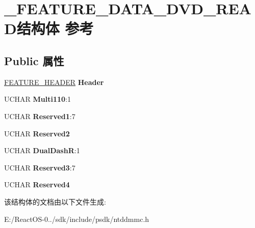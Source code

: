 \hypertarget{struct___f_e_a_t_u_r_e___d_a_t_a___d_v_d___r_e_a_d}{}\section{\+\_\+\+F\+E\+A\+T\+U\+R\+E\+\_\+\+D\+A\+T\+A\+\_\+\+D\+V\+D\+\_\+\+R\+E\+A\+D结构体 参考}
\label{struct___f_e_a_t_u_r_e___d_a_t_a___d_v_d___r_e_a_d}
\subsection*{Public 属性}
\begin{DoxyCompactItemize}
\item 
\mbox{\label{struct___f_e_a_t_u_r_e___d_a_t_a___d_v_d___r_e_a_d_a1c224d40aa3c1f20910facb84d3e70d1}} 
\hyperlink{struct___f_e_a_t_u_r_e___h_e_a_d_e_r}{F\+E\+A\+T\+U\+R\+E\+\_\+\+H\+E\+A\+D\+ER} {\bfseries Header}
\item 
\mbox{\label{struct___f_e_a_t_u_r_e___d_a_t_a___d_v_d___r_e_a_d_abae8913b08fadd8e951b42b1effaed6a}} 
U\+C\+H\+AR {\bfseries Multi110}\+:1
\item 
\mbox{\label{struct___f_e_a_t_u_r_e___d_a_t_a___d_v_d___r_e_a_d_a956da816368fd7b0813510ca8d95857d}} 
U\+C\+H\+AR {\bfseries Reserved1}\+:7
\item 
\mbox{\label{struct___f_e_a_t_u_r_e___d_a_t_a___d_v_d___r_e_a_d_ab9e011898476a11913281ac14f42e6a4}} 
U\+C\+H\+AR {\bfseries Reserved2}
\item 
\mbox{\label{struct___f_e_a_t_u_r_e___d_a_t_a___d_v_d___r_e_a_d_a50c30014a31b40a4815577cd09ce4b9d}} 
U\+C\+H\+AR {\bfseries Dual\+DashR}\+:1
\item 
\mbox{\label{struct___f_e_a_t_u_r_e___d_a_t_a___d_v_d___r_e_a_d_a72f43a5b756beab0223759ffcac1ded8}} 
U\+C\+H\+AR {\bfseries Reserved3}\+:7
\item 
\mbox{\label{struct___f_e_a_t_u_r_e___d_a_t_a___d_v_d___r_e_a_d_a3d576bf8ffd4382a5957ce28e2bf169a}} 
U\+C\+H\+AR {\bfseries Reserved4}
\end{DoxyCompactItemize}


该结构体的文档由以下文件生成\+:\begin{DoxyCompactItemize}
\item 
E\+:/\+React\+O\+S-\/0../sdk/include/psdk/ntddmmc.\+h\end{DoxyCompactItemize}
